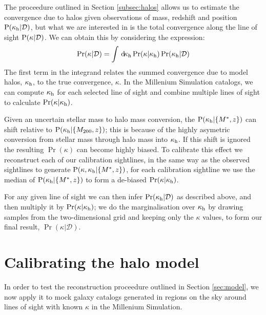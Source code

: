 \documentclass[useAMS,usenatbib]{mn2e}
\begin{document}
The proceedure outlined in Section \ref{subsec:halos} allows us to estimate 
the convergence due to halos given observations of mass, redshift and position
${\rm P}(\kappa_{\rm h}|\mathcal{D})$, but what we are interested in is the total convergence
along the line of sight ${\rm P}(\kappa|\mathcal{D})$. We can obtain this by
considering the expression:
\begin{equation}
\Pr(\kappa|\mathcal{D}) = \int \, \mathrm{d} \!\kappa_{\rm h} 
   \Pr(\kappa|\kappa_{\rm h}) \Pr(\kappa_{\rm h}|\mathcal{D})
\label{eq:kappaconv}   
\end{equation}
The first term in the integrand relates the summed convergence due to model
halos, $\kappa_{\rm h}$, to the true convergence, $\kappa$. In the Millenium
Simulation catalogs, we can compute $\kappa_{\rm h}$ for each
selected line of sight and combine multiple lines of sight to calculate $\Pr(\kappa|\kappa_{\rm h})$.

Given an uncertain stellar mass to halo mass conversion, the
${\rm P}(\kappa_{\rm h}|\{M^{*},z\})$ can shift  relative to
${\rm P}(\kappa_{\rm h}|\{M_{200},z\})$; this is because of the highly asymetric
conversion from stellar mass through halo mass into $\kappa_{\rm h}$. If this shift
is ignored the resulting $\Pr(\kappa)$ can become highly biased. To calibrate
this effect we reconstruct each of our calibration sightlines, in the same way
as the observed sightlines to generate ${\rm P}(\kappa,\kappa_{\rm h}|\{M^{*},z\})$, for
each calibration sightline we use the median of ${\rm P}(\kappa_{\rm h}|\{M^{*},z\})$ to
form a de-biased $\Pr(\kappa|\kappa_{\rm h})$.

For any given line of sight we can then infer
$\Pr(\kappa_{\rm h}|\mathcal{D})$ as described above, and then
multiply it by $\Pr(\kappa|\kappa_{\rm h})$; we do the marginalisation over $\kappa_{\rm h}$
by drawing samples from the two-dimensional grid and keeping only the
$\kappa$ values, to form our final result, $\Pr(\kappa|\mathcal{D})$.



\section{Calibrating the halo model}
\label{sec:knownMh+z} 

In order to test the reconstruction proceedure outlined in Section
\ref{sec:model}, we now apply it to mock galaxy catalogs generated in
regions on the sky around lines of sight with known
$\kappa$ in the Millenium Simulation. 

\end{document}
